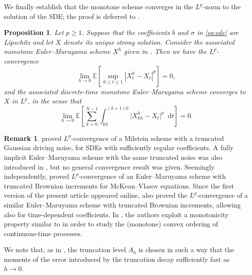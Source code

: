 \documentclass[oneside]{amsart}
\newtheorem{proposition}[theorem]{Proposition}
\theoremstyle{definition}
\newtheorem{remark}[theorem]{Remark}
\newcommand{\D}{\mathop{}\!\mathrm{d}}
\def\E{{\mathbb E}}
\numberwithin{equation}{section}
\begin{document}
	We finally establish that the monotone scheme converges in the $L^p$-norm to the solution of the SDE; the proof is deferred to . 

\begin{proposition}\label{lem:convergence-truncated}
	Let $p\ge 1$.
	Suppose that the coefficients $b$ and $\sigma$ in \eqref{eq:sde} are Lipschitz and let $X$ denote its unique strong solution.
	Consider the associated monotone Euler--Maruyama scheme $X^h$ given in . 
	Then we have the $L^p$-convergence
	\begin{equation}
		\lim_{h \to 0}\E \!\left[\sup_{0 \leq t \leq 1} |X^h_t - X_t|^p \right] = 0,
	\end{equation}
	and the associated discrete-time monotone Euler--Maruyama scheme converges to $X$ in $L^p$, in the sense that
\[
\lim_{h\to 0}
\E \!\left[\sum_{k = 0}^{N - 1} \int_{kh}^{(k+1)h}\lvert X^h_{kh} - X_t \rvert^p \D t\right]
=0.
\]
\end{proposition}

\begin{remark}
	\citet{MiReTr02} proved $L^p$-convergence of a Milstein scheme with a truncated Gaussian driving noise, for SDEs with sufficiently regular coefficients. A fully implicit Euler--Maruyama scheme with the same truncated noise was also introduced in \cite{MiReTr02}, but no general convergence result was given.	
	Seemingly independently, \citet{LiPa22} proved $L^p$-convergence of an Euler--Maruyama scheme with truncated Brownian increments for McKean--Vlasov equations. Since the first version of the present article appeared online, \citet{JoPa23} also proved the $L^p$-convergence of a similar Euler--Maruyama scheme with truncated Brownian increments, allowing also for time-dependent coefficients. In \cite{LiPa22,JoPa23}, the authors exploit a monotonicity property similar to  in order to study the (monotone) convex ordering of continuous-time processes.
	
	We note that, as in \cite{MiReTr02}, the truncation level $A_h$ is chosen in such a way that the moments of the error introduced by the truncation decay sufficiently fast as $h \to 0$.
\end{remark}
\end{document}
